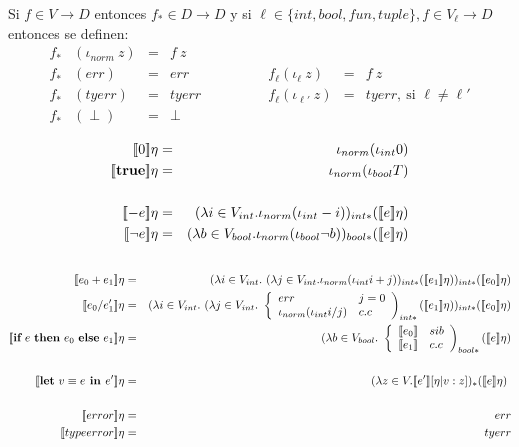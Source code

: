       \PN Si $f\in V\rightarrow D$ entonces $f_{*}\in D\rightarrow D$ y
      \PN si $\ell \in \{int, bool, fun, tuple\}, f \in V_{\ell} \rightarrow D$ entonces se definen:
      \[\begin{array}{lllllll}
        f_* & (\iota_{norm}\ z) &=& f\ z\\
        f_* & (err) &=& err & \qquad \qquad f_{\ell} (\iota_{\ell}\ z) &=& f\ z \\
        f_* & (tyerr) &=& tyerr & \qquad \qquad f_{\ell} (\iota_{\ell'}\ z) &=& tyerr, \ \text{si } \ell \neq \ell'\\
        f_* & (\perp) &=& \perp
      \end{array}\]

      \begin{eqnarray*}
        \se{0}\eta &=& \iota_{norm}(\iota_{int} 0) \\
        \se{\textbf{true}}\eta &=& \iota_{norm}(\iota_{bool} T) \\ \\
        \se{-e}\eta &=& (\lambda i \in V_{int}. \iota_{norm}(\iota_{int} -i))_{int*}(\se{e}\eta) \\
        \se{\neg e}\eta &=& (\lambda b \in V_{bool}. \iota_{norm}(\iota_{bool} \neg b))_{bool*}(\se{e}\eta) \\ \\
      \end{eqnarray*}
      \begin{eqnarray*}
        \se{e_0+e_1}\eta &=& (\lambda i \in V_{int}.\ (\lambda j \in V_{int}. \iota_{norm}(\iota_{int} i+j))_{int*}(\se{e_1}\eta))_{int*}(\se{e_0}\eta) \\
        \se{e_0/e_1'}\eta &=& (\lambda i \in V_{int}. \ (\lambda j \in V_{int}. \ \left\lbrace 
        \begin{array}{lll}
          err & j = 0 \\
          \iota_{norm}(\iota_{int} i/j) & c.c
        \end{array}\right)_{int*} (\se{e_1}\eta))_{int*} (\se{e_0}\eta) \\
        \se{\IF{e}{e_0}{e_1}}\eta &=& (\lambda b \in V_{bool}. \ \left\lbrace 
        \begin{array}{lll}
          \se{e_0} & si b \\
          \se{e_1} & c.c \\
        \end{array}\right)_{bool*} (\se{e}\eta) \\ \\
        \se{\textbf{let} \ v \equiv e \textbf{ in } e'}\eta &=& (\lambda z \in V. \se{e'}[\eta | v : z])_{\ast}(\se{e}\eta) \\ \\
        \se{error}\eta &=& err \\
        \se{typeerror}\eta &=& tyerr
      \end{eqnarray*}

